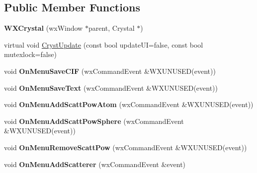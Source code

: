 \subsection*{Public Member Functions}
\begin{DoxyCompactItemize}
\item 
\mbox{\label{class_obj_cryst_1_1_w_x_crystal_a9bbb656f4842a4a406f0402ac8f63176}} 
{\bfseries W\+X\+Crystal} (wx\+Window $\ast$parent, Crystal $\ast$)
\item 
virtual void \mbox{\hyperlink{class_obj_cryst_1_1_w_x_crystal_a4b48719679bb8be44eb77a45ac28f4fb}{Cryst\+Update}} (const bool update\+UI=false, const bool mutexlock=false)
\item 
\mbox{\label{class_obj_cryst_1_1_w_x_crystal_aa47d254619150f39a21a775dd91a1081}} 
void {\bfseries On\+Menu\+Save\+C\+IF} (wx\+Command\+Event \&W\+X\+U\+N\+U\+S\+ED(event))
\item 
\mbox{\label{class_obj_cryst_1_1_w_x_crystal_afa772ec8c7732267bb00d1e2c8e56e24}} 
void {\bfseries On\+Menu\+Save\+Text} (wx\+Command\+Event \&W\+X\+U\+N\+U\+S\+ED(event))
\item 
\mbox{\label{class_obj_cryst_1_1_w_x_crystal_aee65ba76d76a0f1f57b666c1c78dd904}} 
void {\bfseries On\+Menu\+Add\+Scatt\+Pow\+Atom} (wx\+Command\+Event \&W\+X\+U\+N\+U\+S\+ED(event))
\item 
\mbox{\label{class_obj_cryst_1_1_w_x_crystal_ad2736f43a904f9e66b27697dad2f1540}} 
void {\bfseries On\+Menu\+Add\+Scatt\+Pow\+Sphere} (wx\+Command\+Event \&W\+X\+U\+N\+U\+S\+ED(event))
\item 
\mbox{\label{class_obj_cryst_1_1_w_x_crystal_a096f5d8a036b6e4b5365921ec82fb161}} 
void {\bfseries On\+Menu\+Remove\+Scatt\+Pow} (wx\+Command\+Event \&W\+X\+U\+N\+U\+S\+ED(event))
\item 
\mbox{\label{class_obj_cryst_1_1_w_x_crystal_a6e3a438881dcaba21a06e6f4d52720bf}} 
void {\bfseries On\+Menu\+Add\+Scatterer} (wx\+Command\+Event \&event)
\item 

\end{DoxyCompactItemize}
